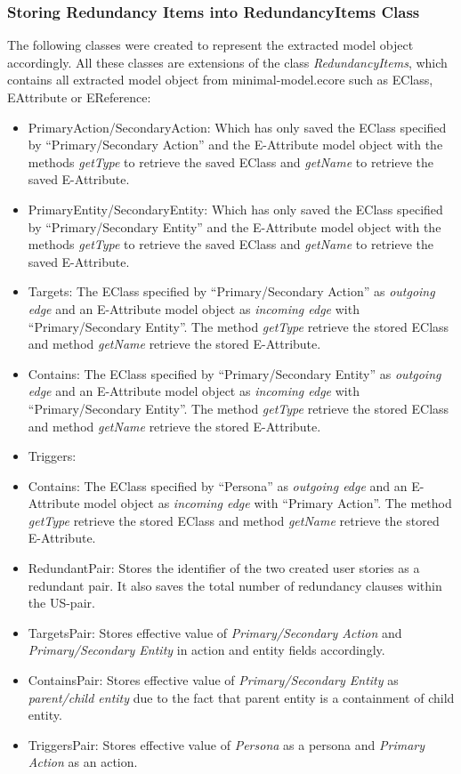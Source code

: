\subsubsection*{Storing Redundancy Items into RedundancyItems Class}
The following classes were created to represent the extracted model object accordingly. All these classes are extensions of the class \textit{RedundancyItems}, which contains all extracted model object from minimal-model.ecore such as EClass, EAttribute or EReference:
\begin{itemize}
	\item PrimaryAction/SecondaryAction: Which has only saved the EClass specified by \enquote{Primary/Secondary Action} and the E-Attribute model object with the methods \textit{getType} to retrieve the saved EClass and \textit{getName} to retrieve the saved E-Attribute.
		\item PrimaryEntity/SecondaryEntity: Which has only saved the EClass specified by \enquote{Primary/Secondary Entity} and the E-Attribute model object with the methods \textit{getType} to retrieve the saved EClass and \textit{getName} to retrieve the saved E-Attribute.
		\item Targets: The EClass specified by \enquote{Primary/Secondary Action} as \textit{outgoing edge} and an E-Attribute model object as \textit{incoming edge} with \enquote{Primary/Secondary Entity}. The method \textit{getType} retrieve the stored EClass and method \textit{getName} retrieve the stored E-Attribute.
		\item Contains: The EClass specified by \enquote{Primary/Secondary Entity} as \textit{outgoing edge} and an E-Attribute model object as \textit{incoming edge} with \enquote{Primary/Secondary Entity}. The method \textit{getType} retrieve the stored EClass and method \textit{getName} retrieve the stored E-Attribute.
		\item Triggers: \item Contains: The EClass specified by \enquote{Persona} as \textit{outgoing edge} and an E-Attribute model object as \textit{incoming edge} with \enquote{Primary Action}. The method \textit{getType} retrieve the stored EClass and method \textit{getName} retrieve the stored E-Attribute.
		\item RedundantPair: Stores the identifier of the two created user stories as a redundant pair. It also saves the total number of redundancy clauses within the US-pair.
		\item TargetsPair: Stores effective value of \textit{Primary/Secondary Action} and \textit{Primary/Secondary Entity} in action and entity fields accordingly.
		\item ContainsPair: Stores effective value of \textit{Primary/Secondary Entity} as \textit{parent/child entity} due to the fact that parent entity is a containment of child entity.
		\item TriggersPair: Stores effective value of \textit{Persona} as a persona and \textit{Primary Action} as an action.
\end{itemize}

